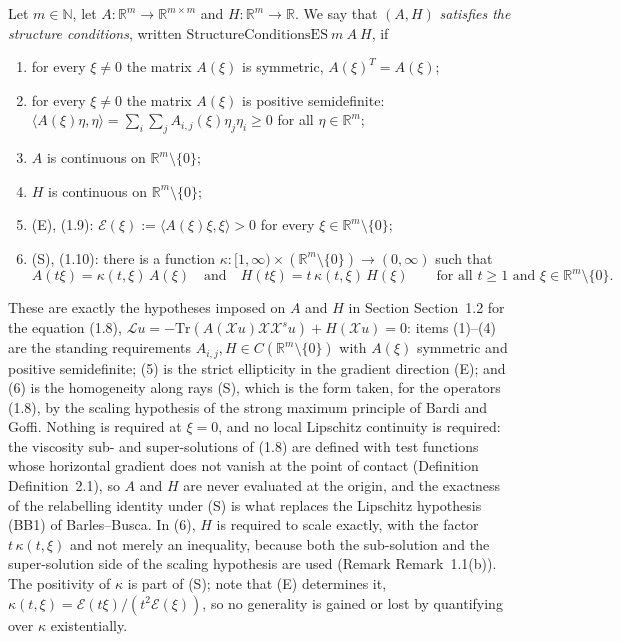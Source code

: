 \begin{definition}
Let $m\in\mathbb N$, let $A:\mathbb R^m\to\mathbb R^{m\times m}$ and
$H:\mathbb R^m\to\mathbb R$. We say that $(A,H)$ \emph{satisfies the structure conditions},
written $\mathrm{StructureConditionsES}\ m\ A\ H$, if
\begin{enumerate}
\item for every $\xi\neq0$ the matrix $A(\xi)$ is symmetric, $A(\xi)^{T}=A(\xi)$;
\item for every $\xi\neq0$ the matrix $A(\xi)$ is positive semidefinite:
  $\langle A(\xi)\eta,\eta\rangle=\sum_{i}\sum_{j}A_{i,j}(\xi)\eta_j\eta_i\ge0$ for all
  $\eta\in\mathbb R^m$;
\item $A$ is continuous on $\mathbb R^m\setminus\{0\}$;
\item $H$ is continuous on $\mathbb R^m\setminus\{0\}$;
\item (E), (1.9): $\mathcal E(\xi):=\langle A(\xi)\xi,\xi\rangle>0$ for every
  $\xi\in\mathbb R^m\setminus\{0\}$;
\item (S), (1.10): there is a function
  $\kappa:[1,\infty)\times(\mathbb R^m\setminus\{0\})\to(0,\infty)$ such that
  \[
   A(t\xi)=\kappa(t,\xi)\,A(\xi)\quad\text{and}\quad H(t\xi)=t\,\kappa(t,\xi)\,H(\xi)
   \qquad\text{for all }t\ge1\text{ and }\xi\in\mathbb R^m\setminus\{0\}.
  \]
\end{enumerate}

These are exactly the hypotheses imposed on $A$ and $H$ in Section Section~1.2 for the
equation (1.8), $\mathcal Lu=-\mathrm{Tr}(A(\mathcal Xu)\mathcal X\mathcal X^{s}u)
+H(\mathcal Xu)=0$: items (1)--(4) are the standing requirements
$A_{i,j},H\in C(\mathbb R^m\setminus\{0\})$ with $A(\xi)$ symmetric and positive
semidefinite; (5) is the strict ellipticity in the gradient direction (E); and (6) is the
homogeneity along rays (S), which is the form taken, for the operators (1.8), by the
scaling hypothesis of the strong maximum principle of Bardi and Goffi. Nothing is required
at $\xi=0$, and no local Lipschitz continuity is required: the viscosity sub- and
super-solutions of (1.8) are defined with test functions whose horizontal gradient does
not vanish at the point of contact (Definition Definition~2.1), so $A$ and $H$ are never
evaluated at the origin, and the exactness of the relabelling identity under (S) is what
replaces the Lipschitz hypothesis (BB1) of Barles--Busca. In (6), $H$ is required to scale
exactly, with the factor $t\,\kappa(t,\xi)$ and not merely an inequality, because both the
sub-solution and the super-solution side of the scaling hypothesis are used (Remark
Remark~1.1(b)). The positivity of $\kappa$ is part of (S); note that (E) determines it,
$\kappa(t,\xi)=\mathcal E(t\xi)/(t^{2}\mathcal E(\xi))$, so no generality is gained or lost
by quantifying over $\kappa$ existentially.
\end{definition}

